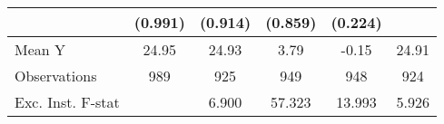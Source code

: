 {\begin{tabular}{l*{5}{c}}
            &     (0.991)         &     (0.914)         &     (0.859)         &     (0.224)         &                     \\
\midrule
Mean Y      &       24.95         &       24.93         &        3.79         &       -0.15         &       24.91         \\
Observations&         989         &         925         &         949         &         948         &         924         \\
Exc. Inst. F-stat&                     &       6.900         &      57.323         &      13.993         &       5.926         \\
\bottomrule
\end{tabular}
}
